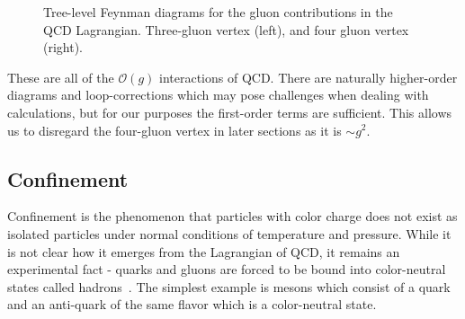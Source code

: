 \documentclass[main.tex]{subfiles}
\begin{document}
\begin{figure}[htb]
    \centering
    \begin{minipage}{.35\textwidth}
    \centering
\end{minipage}%
\begin{minipage}{.35\textwidth}
    \centering
\end{minipage}
\caption{Tree-level Feynman diagrams for the gluon contributions in the QCD Lagrangian. Three-gluon vertex (left), and four gluon vertex (right).}
\label{fig: feynman_gluon_interactions}
\end{figure}

These are all of the \(\mathcal{O}(g)\) interactions of QCD. There are naturally higher-order diagrams and loop-corrections which may pose challenges when dealing with calculations, but for our purposes the first-order terms are sufficient. This allows us to disregard the four-gluon vertex in later sections as it is \(\sim g^2\). 

\subsection{Confinement}
Confinement is the phenomenon that particles with color charge does not exist as isolated particles under normal conditions of temperature and pressure. While it is not clear how it emerges from the Lagrangian of QCD, it remains an experimental fact - quarks and gluons are forced to be bound into color-neutral states called hadrons~\cite{Caucal:2020zcz}. The simplest example is mesons which consist of a quark and an anti-quark of the same flavor which is a color-neutral state. 
\end{document}
